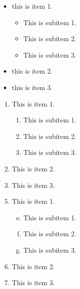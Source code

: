 \documentclass{book} %
\begin{document}
\begin{itemize}
  \item this is item 1.
  \begin{itemize}       %
    \item This is subitem 1.
    \item This is subitem 2.
    \item This is subitem 3.
  \end{itemize}
  \item this is item 2.
  \item this is item 3.
\end{itemize}

\begin{enumerate} [A]      %
  \item This is item 1.
    \begin{enumerate}       %
    \item This is subitem 1.
    \item This is subitem 2.
    \item This is subitem 3.
  \end{enumerate}
  \item This is item 2.
  \item This is item 3.
\end{enumerate}
\begin{enumerate} [\bfseries A.]      %
\setcounter {enumi}{4}  %
  \item This is item 1.
  \begin{enumerate}[a.] 
  \setcounter {enumii}{4}   %
    \item This is subitem 1.
    \item This is subitem 2.
    \item This is subitem 3.
  \end{enumerate}
  \item This is item 2.
  \item This is item 3.
\end{enumerate}
\end{document}
